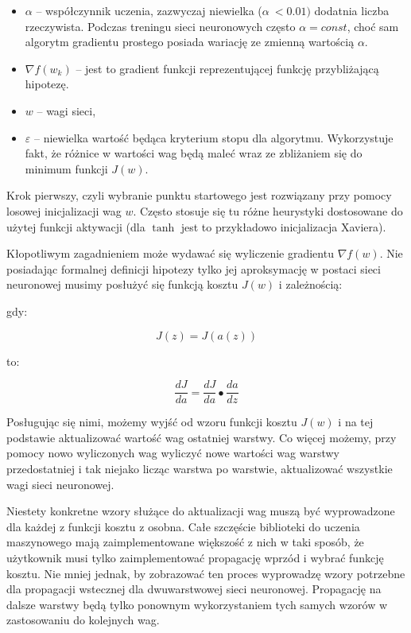 \begin{itemize}
\item
  \(\alpha\) -- współczynnik uczenia, zazwyczaj niewielka
  (\(\alpha\  < 0.01)\) dodatnia liczba rzeczywista. Podczas treningu
  sieci neuronowych często \(\alpha = const\), choć sam algorytm
  gradientu prostego posiada wariację ze zmienną wartością \(\alpha\).
\item
  \(\nabla f(w_{k})\) -- jest to gradient funkcji reprezentującej
  funkcję przybliżającą hipotezę.
\item
  \(w\) -- wagi sieci,
\item
  \(\varepsilon\) -- niewielka wartość będąca kryterium stopu dla
  algorytmu. Wykorzystuje fakt, że różnice w wartości wag będą maleć
  wraz ze zbliżaniem się do minimum funkcji \(J(w)\).
\end{itemize}

Krok pierwszy, czyli wybranie punktu startowego jest rozwiązany przy pomocy losowej inicjalizacji wag \(w\). Często stosuje się tu różne heurystyki dostosowane do użytej funkcji aktywacji (dla \(\tanh\) jest to przykładowo inicjalizacja Xaviera).

Kłopotliwym zagadnieniem może wydawać się wyliczenie gradientu \(\nabla f(w)\). Nie posiadając formalnej definicji hipotezy tylko jej aproksymację w postaci sieci neuronowej musimy posłużyć się funkcją kosztu \(J(w)\) i zależnością:

gdy:

\[J\left( z \right) = J(a\left( z \right))\]

to:

\[\frac{dJ}{da} = \frac{dJ}{da} \bullet \frac{da}{dz}\]

Posługując się nimi, możemy wyjść od wzoru funkcji kosztu \(J(w)\) i na tej podstawie aktualizować wartość wag ostatniej warstwy. Co więcej możemy, przy pomocy nowo wyliczonych wag wyliczyć nowe wartości wag warstwy przedostatniej i tak niejako licząc warstwa po warstwie, aktualizować wszystkie wagi sieci neuronowej.

Niestety konkretne wzory służące do aktualizacji wag muszą być wyprowadzone dla każdej z funkcji kosztu z osobna. Całe szczęście biblioteki do uczenia maszynowego mają zaimplementowane większość z nich w taki sposób, że użytkownik musi tylko zaimplementować propagację wprzód i wybrać funkcję kosztu. Nie mniej jednak, by zobrazować ten proces wyprowadzę wzory potrzebne dla propagacji wstecznej dla dwuwarstwowej sieci neuronowej. Propagację na dalsze warstwy będą tylko ponownym wykorzystaniem
tych samych wzorów w zastosowaniu do kolejnych wag.

